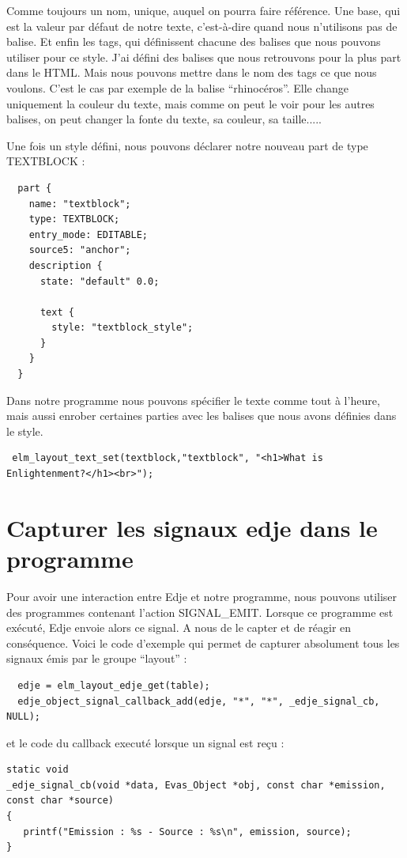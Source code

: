 \documentclass[a4paper]{efr}
\begin{document}
Comme toujours un nom, unique, auquel on pourra faire référence.
Une base, qui est la valeur par défaut de notre texte, c'est-à-dire
quand nous n'utilisons pas de balise. Et enfin les tags, qui définissent
chacune des balises que nous pouvons utiliser pour ce style.
J'ai défini des balises que nous retrouvons pour la plus part dans le HTML.
Mais nous pouvons mettre dans le nom des tags ce que nous voulons.
C'est le cas par exemple de la balise ``rhinocéros''. Elle change uniquement
la couleur du texte, mais comme on peut le voir pour les autres balises, on peut
changer la fonte du texte, sa couleur, sa taille.....

Une fois un style défini, nous pouvons déclarer notre nouveau part de type
TEXTBLOCK :

\begin{lstlisting}
  part {
    name: "textblock";
    type: TEXTBLOCK;
    entry_mode: EDITABLE;
    source5: "anchor";
    description {
      state: "default" 0.0;

      text {
        style: "textblock_style";
      }
    }
  }
\end{lstlisting}

Dans notre programme nous pouvons spécifier le texte comme tout à l'heure, mais
aussi enrober certaines parties avec les balises que nous avons définies dans le style.

\begin{lstlisting}
 elm_layout_text_set(textblock,"textblock", "<h1>What is Enlightenment?</h1><br>");
\end{lstlisting}

\section{Capturer les signaux edje dans le programme}

Pour avoir une interaction entre Edje et notre programme, nous pouvons utiliser
des programmes contenant l'action SIGNAL\_EMIT. Lorsque ce programme est
exécuté, Edje envoie alors ce signal. A nous de le capter et de réagir en
conséquence.
Voici le code d'exemple qui permet de capturer absolument tous les signaux émis
par le groupe ``layout'' :
\begin{lstlisting}
  edje = elm_layout_edje_get(table);
  edje_object_signal_callback_add(edje, "*", "*", _edje_signal_cb, NULL);
\end{lstlisting}

et le code du callback executé lorsque un signal est reçu :
\begin{lstlisting}
static void
_edje_signal_cb(void *data, Evas_Object *obj, const char *emission, const char *source)
{
   printf("Emission : %s - Source : %s\n", emission, source);
}
\end{lstlisting}
\end{document}
